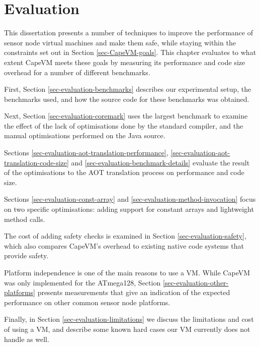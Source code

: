 \chapter{Evaluation}
\label{sec-evaluation}
This dissertation presents a number of techniques to improve the performance of sensor node virtual machines and make them safe, while staying within the constraints set out in Section \ref{sec-CapeVM-goals}. This chapter evaluates to what extent CapeVM meets these goals by measuring its performance and code size overhead for a number of different benchmarks.

First, Section \ref{sec-evaluation-benchmarks} describes our experimental setup, the benchmarks used, and how the source code for these benchmarks was obtained.

Next, Section \ref{sec-evaluation-coremark} uses the largest benchmark to examine the effect of the lack of optimisations done by the standard  compiler, and the manual optimisations performed on the Java source.

Sections \ref{sec-evaluation-aot-translation-performance}, \ref{sec-evaluation-aot-translation-code-size} and \ref{sec-evaluation-benchmark-details} evaluate the result of the optimisations to the AOT translation process on performance and code size.

Sections \ref{sec-evaluation-const-array} and \ref{sec-evaluation-method-invocation} focus on two specific optimisations: adding support for constant arrays and lightweight method calls.

The cost of adding safety checks is examined in Section \ref{sec-evaluation-safety}, which also compares CapeVM's overhead to existing native code systems that provide safety.

Platform independence is one of the main reasons to use a VM. While CapeVM was only implemented for the ATmega128, Section \ref{sec-evaluation-other-platforms} presents measurements that give an indication of the expected performance on other common sensor node platforms.

Finally, in Section \ref{sec-evaluation-limitations} we discuss the limitations and cost of using a VM, and describe some known hard cases our VM currently does not handle as well.
